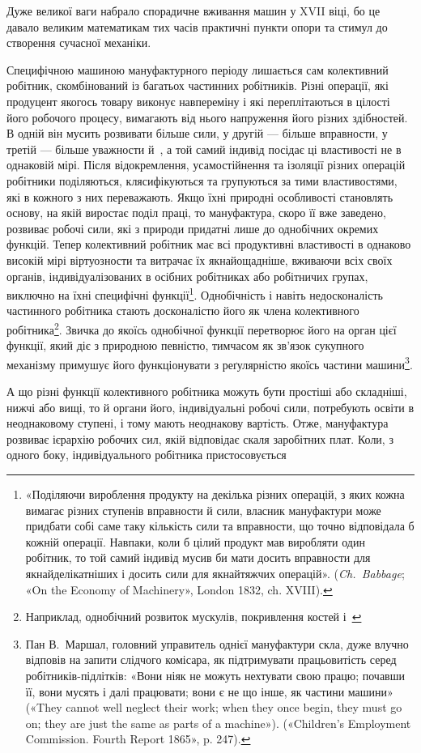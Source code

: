 \parcont{}  %
Дуже великої ваги набрало спорадичне вживання машин у
XVII віці, бо це давало великим математикам тих часів практичні
пункти опори та стимул до створення сучасної механіки.

Специфічною машиною мануфактурного періоду лишається
сам колективний робітник, скомбінований із багатьох частинних
робітників. Різні операції, які продуцент якогось товару виконує
навпереміну і які переплітаються в цілості його робочого процесу,
вимагають від нього напруження його різних здібностей.
В одній він мусить розвивати більше сили, у другій — більше
вправности, у третій — більше уважности й~, а той самий
індивід посідає ці властивості не в однаковій мірі. Після відокремлення,
усамостійнення та ізоляції різних операцій робітники
поділяються, клясифікуються та групуються за тими властивостями,
які в кожного з них переважають. Якщо їхні природні
особливості становлять основу, на якій виростає поділ праці,
то мануфактура, скоро її вже заведено, розвиває робочі сили, які
з природи придатні лише до однобічних окремих функцій. Тепер
колективний робітник має всі продуктивні властивості в однаково
високій мірі віртуозности та витрачає їх якнайощадніше, вживаючи
всіх своїх органів, індивідуалізованих в осібних робітниках
або робітничих групах, виключно на їхні специфічні функції\footnote{
«Поділяючи вироблення продукту на декілька різних операцій,
з яких кожна вимагає різних ступенів вправности й сили, власник мануфактури
може придбати собі саме таку кількість сили та вправности,
що точно відповідала б кожній операції. Навпаки, коли б цілий продукт
мав виробляти один робітник, то той самий індивід мусив би мати досить
вправности для якнайделікатніших і досить сили для якнайтяжчих
операцій». (\emph{Ch.~Babbage}; «On the Economy of Machinery», London 1832,
ch. XVIII).
}. Однобічність і навіть недосконалість частинного робітника стають
досконалістю його як члена колективного робітника\footnote{
Наприклад, однобічний розвиток мускулів, покривлення костей
і~
}. Звичка до якоїсь однобічної функції перетворює його на орган цієї
функції, який діє з природною певністю, тимчасом як зв’язок
сукупного механізму примушує його функціонувати з реґулярністю
якоїсь частини машини\footnote{
Пан В.~Маршал, головний управитель однієї мануфактури скла,
дуже влучно відповів на запити слідчого комісара, як підтримувати
працьовитість серед робітників-підлітків: «Вони ніяк не можуть нехтувати
свою працю; почавши її, вони мусять і далі працювати; вони
є не що інше, як частини машини» («They cannot well neglect their work;
when they once begin, they must go on; they are just the same as parts of
a machine»). («Children’s Employment Commission. Fourth Report 1865»,
p. 247).
}.

А що різні функції колективного робітника можуть бути
простіші або складніші, нижчі або вищі, то й органи його, індивідуальні
робочі сили, потребують освіти в неоднаковому ступені,
і тому мають неоднакову вартість. Отже, мануфактура розвиває
ієрархію робочих сил, якій відповідає скаля заробітних плат.
Коли, з одного боку, індивідуального робітника пристосовується
\parbreak{}  %
